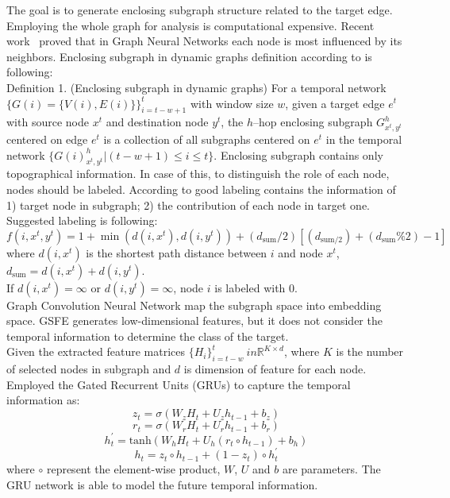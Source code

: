 \documentclass{article}
\newcommand\tab[1][1cm]{\hspace*{#1}}
\begin{document}
The goal is to generate enclosing subgraph structure related to the target edge. Employing the whole graph for analysis is computational expensive. Recent work~\cite{DBLP:journals/corr/abs-1806-03536} proved that in Graph Neural Networks each node is most influenced by its neighbors. Enclosing subgraph in dynamic graphs definition according to \cite{DBLP:journals/corr/abs-2005-07427} is following:\\
\tab Definition 1. (Enclosing subgraph in dynamic graphs) For a temporal network $\{G(i) = \{V(i), E(i)\}\}^t_{i = t-w+1}$ with window size $w$, given a target edge $e^t$ with source node $x^t$ and destination node $y^t$, the $h$--hop enclosing subgraph $G^h_{x^t, y^t}$ centered on edge $e^t$ is a collection of all subgraphs centered on $e^t$ in the temporal network $\{G(i)^h_{x^t, y^t}|(t-w+1)\leq i\leq t \}$. Enclosing subgraph contains only topographical information. In case of this, to distinguish the role of each node, nodes should be labeled. According to \cite{DBLP:journals/corr/abs-2005-07427} good labeling contains the information of 1) target node in subgraph; 2) the contribution of each node in target one.\\
Suggested labeling is following:
\begin{equation}
    f(i,x^t,y^t) = 1 + \min(d(i, x^t), d(i,y^t)) + (d_{\text{sum}}/2)[(d_{\text{sum}/2}) + (d_{\text{sum}}\%2) - 1]
\end{equation}
where $d(i, x^t)$ is the shortest path distance between $i$ and node $x^t$, $d_{\text{sum}} = d(i, x^t) + d(i, y^t)$.\\
If $d(i, x^t) = \infty$ or $d(i, y^t) = \infty$, node $i$ is labeled with 0.
\\
Graph Convolution Neural Network \cite{kipf2017semisupervised} map the subgraph space into embedding space.
GSFE generates low-dimensional features, but it does not consider the temporal information to determine the class of the target.\\
Given the extracted feature matrices $\{H_i\}^t_{i = t-w } \ in \mathbb{R}^{K\times d}$, where $K$ is the number of selected nodes in subgraph and $d$ is dimension of feature for each node.\\
Employed the Gated Recurrent Units (GRUs) \cite{DBLP:journals/corr/ChungGCB14} to capture the temporal information as: 
\begin{equation}
    z_t = \sigma(W_zH_t + U_zh_{t-1} + b_z)
\end{equation}
\begin{equation}
    r_t = \sigma(W_rH_t + U_rh_{t-1} + b_r)
\end{equation}
\begin{equation}
    h^{'}_{t} = \text{tanh}(W_hH_t + U_h(r_t \circ h_{t-1}) + b_h)
\end{equation}
\begin{equation}
    h_t = z_t \circ h_{t-1} + (1-z_t) \circ h^{'}_{t}
\end{equation}
where $\circ$ represent the element-wise product, $W$, $U$ and $b$ are parameters. The GRU network is able to model the future temporal information.
\end{document}
